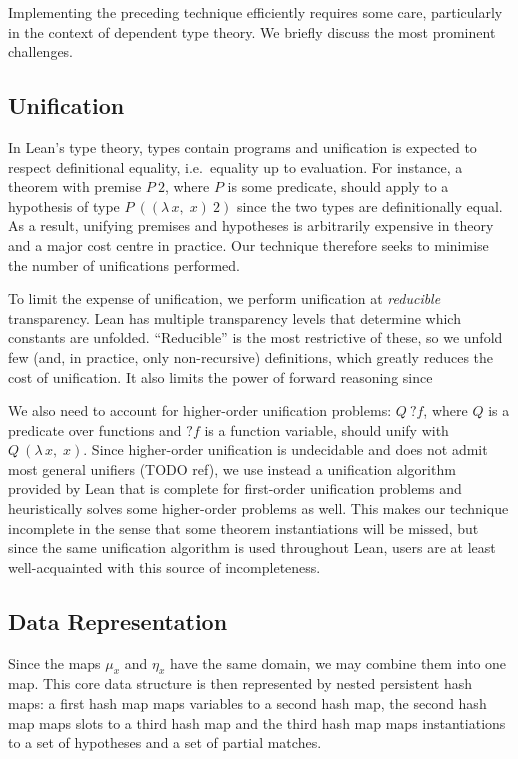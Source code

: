 \documentclass[runningheads]{llncs}
\newcommand{\jcom}[1]{{\color{orange}{Jannis: #1}} }
\newcommand{\Lam}[2]{\ensuremath{\lambda\, #1,\; #2}}
\newcommand{\mvar}[1]{\ensuremath{?#1}}
\begin{document}
Implementing the preceding technique efficiently requires some care, particularly in the context of dependent type theory.
We briefly discuss the most prominent challenges.

\subsection{Unification}%
\label{sec:unification}

In Lean's type theory, types contain programs and unification is expected to respect definitional equality, i.e.\ equality up to evaluation.
For instance, a theorem with premise $P~2$, where $P$ is some predicate, should apply to a hypothesis of type $P~((\Lam{x}{x})~2)$ since the two types are definitionally equal.
As a result, unifying premises and hypotheses is arbitrarily expensive in theory and a major cost centre in practice.
Our technique therefore seeks to minimise the number of unifications performed.

To limit the expense of unification, we perform unification at \emph{reducible} transparency.
Lean has multiple transparency levels that determine which constants are unfolded.
\enquote{Reducible} is the most restrictive of these, so we unfold few (and, in practice, only non-recursive) definitions, which greatly reduces the cost of unification.
It also limits the power of forward reasoning since

We also need to account for higher-order unification problems: $Q~\mvar{f}$, where $Q$ is a predicate over functions and $\mvar{f}$ is a function variable, should unify with $Q~(\Lam{x}{x})$.
Since higher-order unification is undecidable and does not admit most general unifiers (TODO ref), we use instead a unification algorithm provided by Lean that is complete for first-order unification problems and heuristically solves some higher-order problems as well.
This makes our technique incomplete in the sense that some theorem instantiations will be missed, but since the same unification algorithm is used throughout Lean, users are at least well-acquainted with this source of incompleteness.

\jcom{TODO: mvars in hyps are treated as rigid}

\subsection{Data Representation}

Since the maps $μ_{x}$  and $η_{x}$ have the same domain, we may combine them into one map.
This core data structure is then represented by nested persistent hash maps: a first hash map maps variables to a second hash map, the second hash map maps slots to a third hash map and the third hash map maps instantiations to a set of hypotheses and a set of partial matches.
\end{document}
